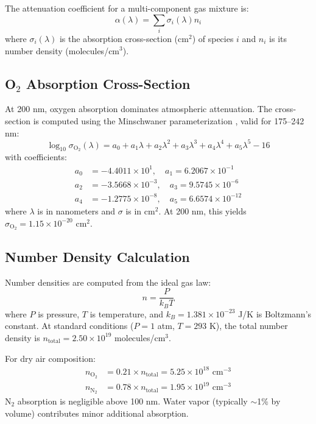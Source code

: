 The attenuation coefficient for a multi-component gas mixture is:
\begin{equation}
\alpha(\lambda) = \sum_i \sigma_i(\lambda) n_i
\end{equation}
where $\sigma_i(\lambda)$ is the absorption cross-section (cm$^2$) of species $i$ and $n_i$ is its number density (molecules/cm$^3$).

\subsection{O$_2$ Absorption Cross-Section}

At 200 nm, oxygen absorption dominates atmospheric attenuation. The cross-section is computed using the Minschwaner parameterization \cite{minschwaner1992}, valid for 175--242 nm:
\begin{equation}
\log_{10} \sigma_{\text{O}_2}(\lambda) = a_0 + a_1\lambda + a_2\lambda^2 + a_3\lambda^3 + a_4\lambda^4 + a_5\lambda^5 - 16
\end{equation}
with coefficients:
\begin{align*}
a_0 &= -4.4011 \times 10^1, \quad a_1 = 6.2067 \times 10^{-1} \\
a_2 &= -3.5668 \times 10^{-3}, \quad a_3 = 9.5745 \times 10^{-6} \\
a_4 &= -1.2775 \times 10^{-8}, \quad a_5 = 6.6574 \times 10^{-12}
\end{align*}
where $\lambda$ is in nanometers and $\sigma$ is in cm$^2$. At 200 nm, this yields $\sigma_{\text{O}_2} = 1.15 \times 10^{-20}$ cm$^2$.

\subsection{Number Density Calculation}

Number densities are computed from the ideal gas law:
\begin{equation}
n = \frac{P}{k_B T}
\end{equation}
where $P$ is pressure, $T$ is temperature, and $k_B = 1.381 \times 10^{-23}$ J/K is Boltzmann's constant. At standard conditions ($P = 1$ atm, $T = 293$ K), the total number density is $n_{\text{total}} = 2.50 \times 10^{19}$ molecules/cm$^3$.

For dry air composition:
\begin{align}
n_{\text{O}_2} &= 0.21 \times n_{\text{total}} = 5.25 \times 10^{18} \text{ cm}^{-3} \\
n_{\text{N}_2} &= 0.78 \times n_{\text{total}} = 1.95 \times 10^{19} \text{ cm}^{-3}
\end{align}
N$_2$ absorption is negligible above 100 nm. Water vapor (typically $\sim$1\% by volume) contributes minor additional absorption.

